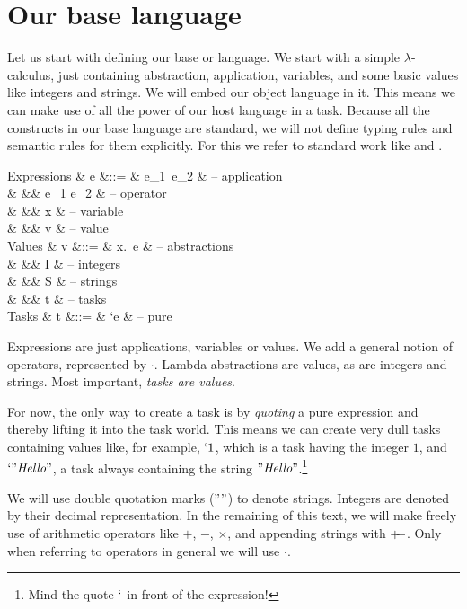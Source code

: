 
\section{Our base language}

Let us start with defining our base or language.
We start with a simple $\lambda$-calculus,
just containing abstraction, application, variables,
and some basic values like integers and strings.
We will embed our object language in it.
This means we can make use of all the power of our host language in a task.
Because all the constructs in our base language are standard,
we will not define typing rules and semantic rules for them explicitly.
For this we refer to standard work like \textcite{Pierce:2002tp} and \textcite{Harper:2016uj}.

\begin{grammar}
  Expressions
    & e &::= & e_1\ e_2       & – application \\
    &   &\mid& e_1 \cdot e_2  & – operator \\
    &   &\mid& x              & – variable \\
    &   &\mid& v              & – value \\
  Values
    & v &::= & \lambda x.\ e  & – abstractions \\
    &   &\mid& I              & – integers \\
    &   &\mid& S              & – strings \\
    &   &\mid& t              & – tasks \\
  Tasks
    & t &::= & `e             & – pure \\
\end{grammar}

Expressions are just applications, variables or values.
We add a general notion of operators, represented by $\cdot$.
Lambda abstractions are values, as are integers and strings.
Most important, \emph{tasks are values}.

For now, the only way to create a task is by \emph{quoting} a pure expression
and thereby lifting it into the task world.
This means we can create very dull tasks containing values like, for example, $`1$,
which is a task having the integer $1$,
and $`"\textit{Hello}"$, a task always containing the string $"\textit{Hello}"$.\footnote{
  Mind the quote $`$ in front of the expression!
}

We will use double quotation marks ($""$) to denote strings.
Integers are denoted by their decimal representation.
In the remaining of this text,
we will make freely use of arithmetic operators like $+$, $-$, $\times$,
and appending strings with $+\!\!+$.
Only when referring to operators in general we will use $\cdot$.


